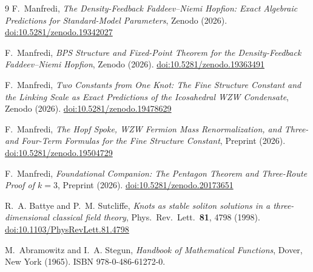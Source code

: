 \documentclass[11pt,a4paper]{article}
\theoremstyle{definition}
\theoremstyle{remark}
\begin{document}

\begin{thebibliography}{9}
F.~Manfredi,
\textit{The Density-Feedback Faddeev--Niemi Hopfion:
  Exact Algebraic Predictions for Standard-Model Parameters},
Zenodo (2026).
\href{https://doi.org/10.5281/zenodo.19342027}{doi:10.5281/zenodo.19342027}

F.~Manfredi,
\textit{BPS Structure and Fixed-Point Theorem for the
  Density-Feedback Faddeev--Niemi Hopfion},
Zenodo (2026).
\href{https://doi.org/10.5281/zenodo.19363491}{doi:10.5281/zenodo.19363491}

F.~Manfredi,
\textit{Two Constants from One Knot: The Fine Structure Constant and
  the Linking Scale as Exact Predictions of the Icosahedral WZW Condensate},
Zenodo (2026).
\href{https://doi.org/10.5281/zenodo.19478629}{doi:10.5281/zenodo.19478629}

F.~Manfredi,
\textit{The Hopf Spoke, WZW Fermion Mass Renormalization,
  and Three- and Four-Term Formulas for the Fine Structure Constant},
Preprint (2026).
\href{https://doi.org/10.5281/zenodo.19504729}{doi:10.5281/zenodo.19504729}

F.~Manfredi,
\textit{Foundational Companion: The Pentagon Theorem and Three-Route
Proof of $k=3$},
Preprint (2026).
\href{https://doi.org/10.5281/zenodo.20173651}{doi:10.5281/zenodo.20173651}

R.~A. Battye and P.~M. Sutcliffe,
\textit{Knots as stable soliton solutions in a three-dimensional classical
field theory},
Phys.\ Rev.\ Lett.\ \textbf{81}, 4798 (1998).
\href{https://doi.org/10.1103/PhysRevLett.81.4798}{doi:10.1103/PhysRevLett.81.4798}

M.~Abramowitz and I.~A. Stegun,
\textit{Handbook of Mathematical Functions},
Dover, New York (1965).
ISBN 978-0-486-61272-0.
\end{thebibliography}
\end{document}

